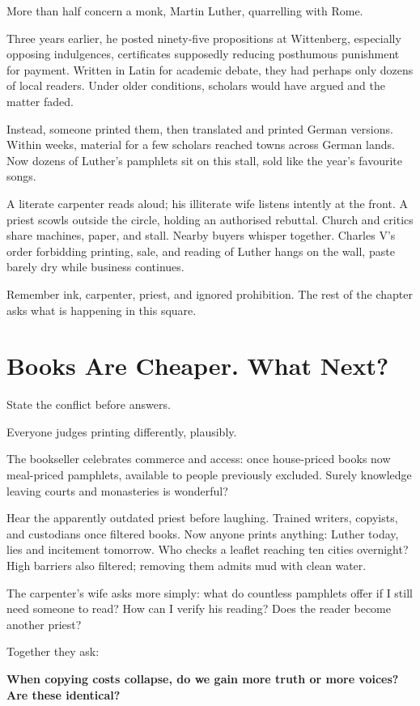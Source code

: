 More than half concern a monk, Martin Luther, quarrelling with Rome.

Three years earlier, he posted ninety-five propositions at Wittenberg, especially opposing indulgences, certificates supposedly reducing posthumous punishment for payment. Written in Latin for academic debate, they had perhaps only dozens of local readers. Under older conditions, scholars would have argued and the matter faded.

Instead, someone printed them, then translated and printed German versions. Within weeks, material for a few scholars reached towns across German lands. Now dozens of Luther's pamphlets sit on this stall, sold like the year's favourite songs.

A literate carpenter reads aloud; his illiterate wife listens intently at the front. A priest scowls outside the circle, holding an authorised rebuttal. Church and critics share machines, paper, and stall. Nearby buyers whisper together. Charles V's order forbidding printing, sale, and reading of Luther hangs on the wall, paste barely dry while business continues.

Remember ink, carpenter, priest, and ignored prohibition. The rest of the chapter asks what is happening in this square.

\section{Books Are Cheaper. What Next?}
State the conflict before answers.

Everyone judges printing differently, plausibly.

The bookseller celebrates commerce and access: once house-priced books now meal-priced pamphlets, available to people previously excluded. Surely knowledge leaving courts and monasteries is wonderful?

Hear the apparently outdated priest before laughing. Trained writers, copyists, and custodians once filtered books. Now anyone prints anything: Luther today, lies and incitement tomorrow. Who checks a leaflet reaching ten cities overnight? High barriers also filtered; removing them admits mud with clean water.

The carpenter's wife asks more simply: what do countless pamphlets offer if I still need someone to read? How can I verify his reading? Does the reader become another priest?

Together they ask:

\textbf{When copying costs collapse, do we gain more truth or more voices? Are these identical?}

